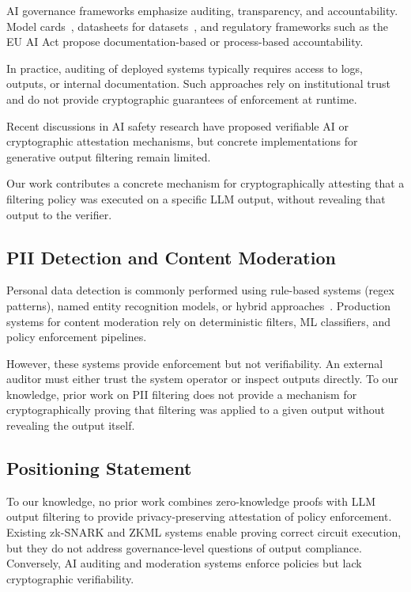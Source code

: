 \documentclass[10pt,conference,a4paper]{IEEEtran}
\begin{document}
AI governance frameworks emphasize auditing, transparency, and accountability. Model cards~\cite{mitchell2019modelcards}, datasheets for datasets~\cite{gebru2018datasheets}, and regulatory frameworks such as the EU AI Act propose documentation-based or process-based accountability.

In practice, auditing of deployed systems typically requires access to logs, outputs, or internal documentation. Such approaches rely on institutional trust and do not provide cryptographic guarantees of enforcement at runtime.

Recent discussions in AI safety research have proposed verifiable AI or cryptographic attestation mechanisms, but concrete implementations for generative output filtering remain limited.

Our work contributes a concrete mechanism for cryptographically attesting that a filtering policy was executed on a specific LLM output, without revealing that output to the verifier.

\subsection{PII Detection and Content Moderation}

Personal data detection is commonly performed using rule-based systems (regex patterns), named entity recognition models, or hybrid approaches~\cite{dernoncourt2017deid}. Production systems for content moderation rely on deterministic filters, ML classifiers, and policy enforcement pipelines.

However, these systems provide enforcement but not verifiability. An external auditor must either trust the system operator or inspect outputs directly. To our knowledge, prior work on PII filtering does not provide a mechanism for cryptographically proving that filtering was applied to a given output without revealing the output itself.

\subsection{Positioning Statement}

To our knowledge, no prior work combines zero-knowledge proofs with LLM output filtering to provide privacy-preserving attestation of policy enforcement. Existing zk-SNARK and ZKML systems enable proving correct circuit execution, but they do not address governance-level questions of output compliance. Conversely, AI auditing and moderation systems enforce policies but lack cryptographic verifiability.
\end{document}
